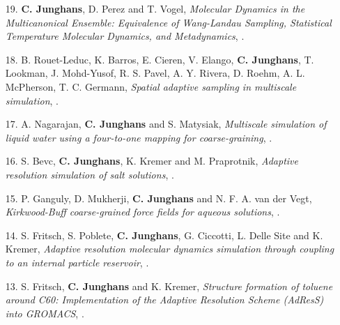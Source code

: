 \documentclass{article}
\begin{document}
\begin{enumerate}
\item[19.] \textbf{C. Junghans}, D. Perez and T. Vogel,
  \textit{Molecular Dynamics in the Multicanonical Ensemble: Equivalence of Wang-Landau Sampling, Statistical Temperature Molecular Dynamics, and Metadynamics},
  .

\item[18.] B. Rouet-Leduc, K. Barros, E. Cieren, V. Elango, \textbf{C. Junghans}, T. Lookman, J. Mohd-Yusof, R. S. Pavel, A. Y. Rivera, D. Roehm, A. L. McPherson, T. C. Germann,
  \textit{Spatial adaptive sampling in multiscale simulation},
  .

\item[17.] A. Nagarajan, \textbf{C. Junghans} and S. Matysiak,
  \textit{Multiscale simulation of liquid water using a four-to-one mapping for coarse-graining},
  .

\item[16.] S. Bevc, \textbf{C. Junghans}, K. Kremer and M. Praprotnik,
  \textit{Adaptive resolution simulation of salt solutions},
  .

\item[15.] P. Ganguly, D. Mukherji, \textbf{C. Junghans} and N. F. A. van der Vegt,
  \textit{Kirkwood-Buff coarse-grained force fields for aqueous solutions},
  .

\item[14.] S. Fritsch, S. Poblete, \textbf{C. Junghans}, G. Ciccotti, L. Delle Site and K. Kremer,
  \textit{Adaptive resolution molecular dynamics simulation through coupling to an internal particle reservoir},
  .

\item[13.] S. Fritsch, \textbf{C. Junghans} and K. Kremer,
  \textit{Structure formation of toluene around C60: Implementation of the Adaptive Resolution Scheme (AdResS) into GROMACS},
  .


\end{enumerate}
\end{document}
